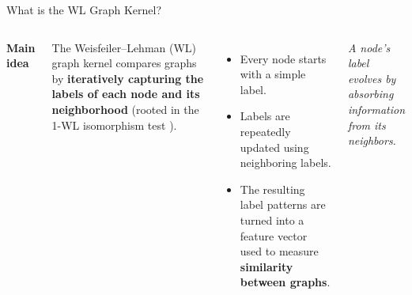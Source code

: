 \documentclass[aspectratio=169, 11pt]{beamer}
\begin{document}
\begin{frame}{What is the WL Graph Kernel?}
    \begin{columns}[c]
        \textbf{Main idea}
        \vspace{0.15cm}

        The Weisfeiler--Lehman (WL) graph kernel \cite{shervashidze2011weisfeiler} compares graphs by \textbf{iteratively capturing the
        labels of each node and its neighborhood} (rooted in the 1-WL isomorphism test \cite{weisfeiler1968reduction}).

        \vspace{0.3cm}
        \begin{itemize}
            \item Every node starts with a simple label.
            \item Labels are repeatedly updated using neighboring labels.
            \item The resulting label patterns are turned into a
            feature vector used to measure \textbf{similarity between graphs}.
        \end{itemize}

        \centering

        \vspace{0.1cm}
        {\scriptsize\itshape A node's label evolves by absorbing
        information from its neighbors.}
    \end{columns}
\end{frame}
\end{document}
